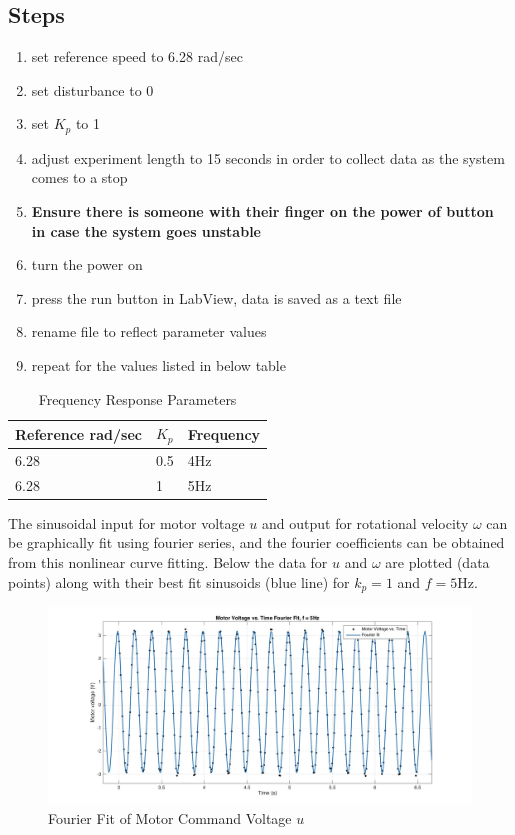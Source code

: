 \documentclass[11pt,titlepage]{article}
\begin{document}
	\subsection*{Steps}
		\begin{enumerate}
			\item set reference speed to 6.28 rad/sec
			\item set disturbance to 0
			\item set $K_p$ to 1
			\item adjust experiment length to 15 seconds in order to collect data as the system comes to a stop
			\item \textbf{Ensure there is someone with their finger on the power of button in case the system goes unstable}
			\item turn the power on
			\item press the run button in LabView, data is saved as a text file
			\item rename file to reflect parameter values
			\item repeat for the values listed in below table
		\end{enumerate}
		\begin{table}[h!]
			\centering
			\begin{tabular}{|m{4cm}|m{3cm}|m{3cm}|} 
				\hline
				Reference rad/sec & $K_p$ & Frequency \\ 
				\hline
				6.28 & 0.5 & 4Hz \\
				\hline
				6.28 & 1 & 5Hz\\
				\hline
			\end{tabular}
			\caption{Frequency Response Parameters} \label{table:freq_param}
		\end{table}
		The sinusoidal input for motor voltage $u$ and output for rotational velocity $\omega$ can be graphically fit using fourier series, and the fourier coefficients can be obtained from this nonlinear curve fitting. Below the data for $u$ and $\omega$ are plotted (data points) along with their best fit sinusoids (blue line) for $k_p=1$ and $f=5$Hz.
	\begin{figure}[H]
		\centering
		\includegraphics[scale=0.25]{fourier_volt_5Hz}
		\caption{Fourier Fit of Motor Command Voltage $u$}
		\label{fig:fourier_volt_5Hz}
	\end{figure}
\end{document}
